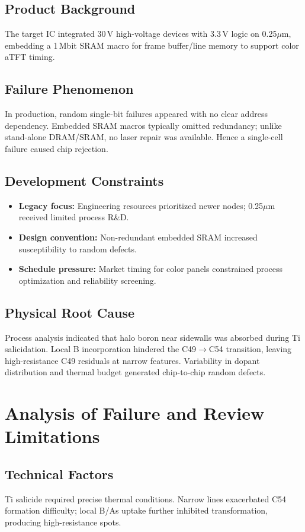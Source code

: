 \documentclass[conference]{IEEEtran}
\begin{document}
\subsection{Product Background}
The target IC integrated 30\,V high-voltage devices with 3.3\,V logic on 0.25$\mu$m, embedding a 1\,Mbit SRAM macro for frame buffer/line memory to support color aTFT timing.

\subsection{Failure Phenomenon}
In production, random single-bit failures appeared with no clear address dependency. Embedded SRAM macros typically omitted redundancy; unlike stand-alone DRAM/SRAM, no laser repair was available. Hence a single-cell failure caused chip rejection.

\subsection{Development Constraints}
\begin{itemize}
  \item \textbf{Legacy focus:} Engineering resources prioritized newer nodes; 0.25$\mu$m received limited process R\&D.
  \item \textbf{Design convention:} Non-redundant embedded SRAM increased susceptibility to random defects.
  \item \textbf{Schedule pressure:} Market timing for color panels constrained process optimization and reliability screening.
\end{itemize}

\subsection{Physical Root Cause}
Process analysis indicated that halo boron near sidewalls was absorbed during Ti salicidation. Local B incorporation hindered the C49$\rightarrow$C54 transition, leaving high-resistance C49 residuals at narrow features. Variability in dopant distribution and thermal budget generated chip-to-chip random defects.

\section{Analysis of Failure and Review Limitations}

\subsection{Technical Factors}
Ti salicide required precise thermal conditions. Narrow lines exacerbated C54 formation difficulty; local B/As uptake further inhibited transformation, producing high-resistance spots.
\end{document}
